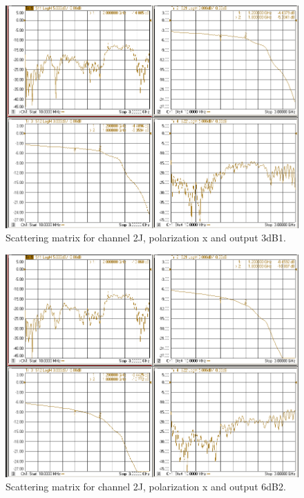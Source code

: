 \documentclass[12pt,a4paper,oneside]{article}
\begin{document}
\begin{figure}[H]
\centering
\includegraphics[width=0.9\linewidth]{VNA_results/2Jx_3dB1.png}
\caption{Scattering matrix for channel 2J, polarization x and output 3dB1.}
\label{fig:2Jx_3dB1}
\end{figure}


\begin{figure}[H]
\centering
\includegraphics[width=0.9\linewidth]{VNA_results/2Jx_6dB2.png}
\caption{Scattering matrix for channel 2J, polarization x and output 6dB2.}
\label{fig:2Jx_6dB2}
\end{figure}
\end{document}
